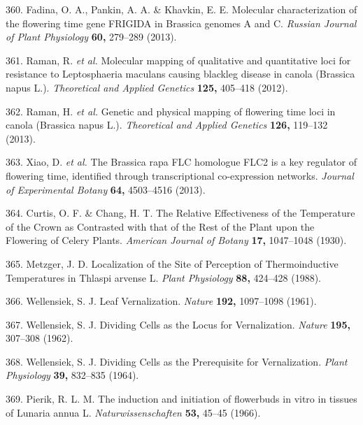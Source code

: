 \documentclass[12pt,]{book}
\begin{document}
\hypertarget{ref-fadina_molecular_2013}{}
360. Fadina, O. A., Pankin, A. A. \& Khavkin, E. E. Molecular
characterization of the flowering time gene FRIGIDA in Brassica genomes
A and C. \emph{Russian Journal of Plant Physiology} \textbf{60,}
279--289 (2013).

\hypertarget{ref-raman_molecular_2012}{}
361. Raman, R. \emph{et al.} Molecular mapping of qualitative and
quantitative loci for resistance to Leptosphaeria maculans causing
blackleg disease in canola (Brassica napus L.). \emph{Theoretical and
Applied Genetics} \textbf{125,} 405--418 (2012).

\hypertarget{ref-raman_genetic_2013}{}
362. Raman, H. \emph{et al.} Genetic and physical mapping of flowering
time loci in canola (Brassica napus L.). \emph{Theoretical and Applied
Genetics} \textbf{126,} 119--132 (2013).

\hypertarget{ref-xiao_brassica_2013}{}
363. Xiao, D. \emph{et al.} The Brassica rapa FLC homologue FLC2 is a
key regulator of flowering time, identified through transcriptional
co-expression networks. \emph{Journal of Experimental Botany}
\textbf{64,} 4503--4516 (2013).

\hypertarget{ref-curtis_relative_1930}{}
364. Curtis, O. F. \& Chang, H. T. The Relative Effectiveness of the
Temperature of the Crown as Contrasted with that of the Rest of the
Plant upon the Flowering of Celery Plants. \emph{American Journal of
Botany} \textbf{17,} 1047--1048 (1930).

\hypertarget{ref-metzger_localization_1988}{}
365. Metzger, J. D. Localization of the Site of Perception of
Thermoinductive Temperatures in Thlaspi arvense L. \emph{Plant
Physiology} \textbf{88,} 424--428 (1988).

\hypertarget{ref-wellensiek_leaf_1961}{}
366. Wellensiek, S. J. Leaf Vernalization. \emph{Nature} \textbf{192,}
1097--1098 (1961).

\hypertarget{ref-wellensiek_dividing_1962}{}
367. Wellensiek, S. J. Dividing Cells as the Locus for Vernalization.
\emph{Nature} \textbf{195,} 307--308 (1962).

\hypertarget{ref-wellensiek_dividing_1964}{}
368. Wellensiek, S. J. Dividing Cells as the Prerequisite for
Vernalization. \emph{Plant Physiology} \textbf{39,} 832--835 (1964).

\hypertarget{ref-pierik_lunaria_1966}{}
369. Pierik, R. L. M. The induction and initiation of flowerbuds in
vitro in tissues of Lunaria annua L. \emph{Naturwissenschaften}
\textbf{53,} 45--45 (1966).
\end{document}
